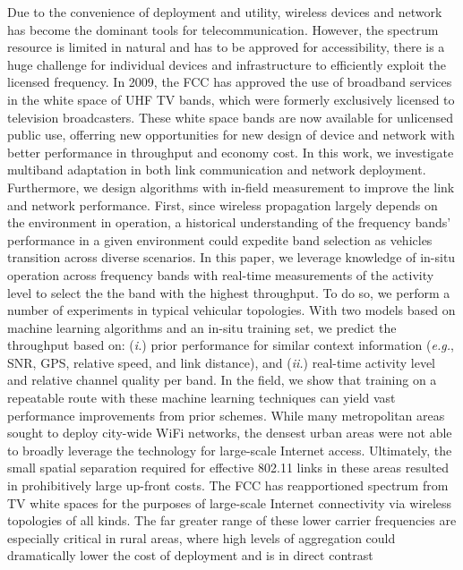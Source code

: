 

Due to the convenience of deployment and utility, wireless devices and network
has become the dominant tools for telecommunication. However, the spectrum resource
is limited in natural and has to be approved for accessibility, there is a huge challenge 
for individual devices and infrastructure to efficiently exploit the licensed 
frequency. 
In 2009, the FCC has approved the use of broadband services in the white space 
of UHF TV bands, which were formerly exclusively licensed to television broadcasters.
These white space bands are now available for unlicensed public use, offerring
new opportunities for new design of device and network with better performance in 
throughput and economy cost. In this work, we investigate multiband adaptation
in both link communication and network deployment. Furthermore, we design algorithms
with in-field measurement to improve the link and network performance.
First, since wireless propagation largely depends on the environment
in operation, a historical understanding of the frequency bands' performance in
a given environment could expedite band selection as vehicles transition across
diverse scenarios. In this paper, we leverage knowledge of in-situ operation
across frequency bands with real-time measurements of the activity level to 
select the the band with the highest throughput. To do so, we
perform a number of experiments in typical vehicular topologies. With two
models based on machine learning algorithms and an in-situ training set, we 
predict the throughput based on: ({\it i.}) prior performance for similar
context information ({\it e.g.}, SNR, GPS, relative speed, and link distance),
and ({\it ii.}) real-time activity level and relative channel quality per band.
In the field, we show that training on a repeatable route with these machine
learning techniques can yield vast performance improvements from prior schemes. 
While many metropolitan areas sought to deploy city-wide WiFi networks, the densest urban areas were not
able to broadly leverage the technology for large-scale Internet access.  Ultimately, the small 
spatial separation required for effective 802.11 links in these areas resulted in prohibitively large up-front 
costs.  The FCC has reapportioned spectrum from TV white spaces for the purposes of large-scale Internet 
connectivity via wireless topologies of all kinds.
The far greater range of these lower carrier frequencies are especially critical in rural areas, where
high levels of aggregation could dramatically lower the cost of deployment and is in direct contrast 
